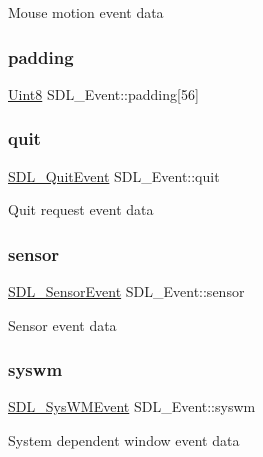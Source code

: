 Mouse motion event data \mbox{\label{union_s_d_l___event_aabb599570edfa54aad6255c1f24f2ad2}} 
\subsubsection{\texorpdfstring{padding}{padding}}
{\footnotesize\ttfamily \mbox{\hyperlink{_s_d_l__stdinc_8h_a2944638813a090aa23e62f4da842c3e2}{Uint8}} S\+D\+L\+\_\+\+Event\+::padding\mbox{[}56\mbox{]}}

\mbox{\label{union_s_d_l___event_a102a3008afe67a1c02ae7504e232dcef}} 
\subsubsection{\texorpdfstring{quit}{quit}}
{\footnotesize\ttfamily \mbox{\hyperlink{struct_s_d_l___quit_event}{S\+D\+L\+\_\+\+Quit\+Event}} S\+D\+L\+\_\+\+Event\+::quit}

Quit request event data \mbox{\label{union_s_d_l___event_af0da8e4a59228360984595125062eb2f}} 
\subsubsection{\texorpdfstring{sensor}{sensor}}
{\footnotesize\ttfamily \mbox{\hyperlink{struct_s_d_l___sensor_event}{S\+D\+L\+\_\+\+Sensor\+Event}} S\+D\+L\+\_\+\+Event\+::sensor}

Sensor event data \mbox{\label{union_s_d_l___event_ab3b2eaf5348d4c50a51b1f297fdef537}} 
\subsubsection{\texorpdfstring{syswm}{syswm}}
{\footnotesize\ttfamily \mbox{\hyperlink{struct_s_d_l___sys_w_m_event}{S\+D\+L\+\_\+\+Sys\+W\+M\+Event}} S\+D\+L\+\_\+\+Event\+::syswm}

System dependent window event data \mbox{\label{union_s_d_l___event_aa4fc65c559d69f33c057c0c23d8414b8}} 
